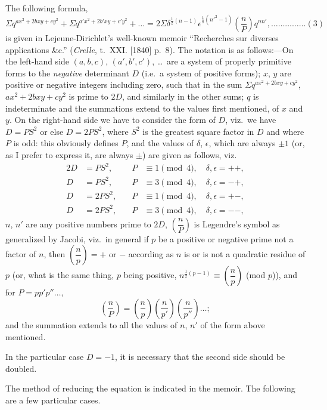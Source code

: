 \documentclass[11pt]{article}
\begin{document}
The following formula,
\[
\Sigma q^{ax^2 + 2bxy + cy^2} + \Sigma q^{a'x^2 + 2b'xy + c'y^2} + \ldots
= 2\Sigma \delta^{\frac{1}{2}(n-1)} \epsilon^{\frac{1}{8}(n'^2-1)} \left(\frac{n}{P}\right) q^{nn'},\ldots\ldots\ldots\ldots\ldots(3)
\]
is given in Lejeune-Dirichlet's well-known memoir ``Recherches sur diverses applications \&c.'' (\textit{Crelle}, t.~XXI. [1840] p.~8). The notation is as follows:---On the left-hand side $(a, b, c)$, $(a', b', c')$, \ldots\ are a system of properly primitive forms to the \textit{negative} determinant $D$ (i.e.\ a system of positive forms); $x$, $y$ are positive or negative integers including zero, such that in the sum $\Sigma q^{ax^2 + 2bxy + cy^2}$, $ax^2 + 2bxy + cy^2$ is prime to $2D$, and similarly in the other sums; $q$ is indeterminate and the summations extend to the values first mentioned, of $x$ and $y$. On the right-hand side we have to consider the form of $D$, viz.\ we have $D = PS^2$ or else $D = 2PS^2$, where $S^2$ is the greatest square factor in $D$ and where $P$ is odd: this obviously defines $P$, and the values of $\delta$, $\epsilon$, which are always $\pm 1$ (or, as I prefer to express it, are always $\pm$) are given as follows, viz.
\begin{alignat*}{2}
D &= PS^2, &\quad P &\equiv 1 \pmod{4}, \quad \delta, \epsilon = ++,\\
D &= PS^2, &\quad P &\equiv 3 \pmod{4}, \quad \delta, \epsilon = -+,\\
D &= 2PS^2, &\quad P &\equiv 1 \pmod{4}, \quad \delta, \epsilon = +-,\\
D &= 2PS^2, &\quad P &\equiv 3 \pmod{4}, \quad \delta, \epsilon = --,
\end{alignat*}
$n$, $n'$ are any positive numbers prime to $2D$, $\left(\dfrac{n}{P}\right)$ is Legendre's symbol as generalized by Jacobi, viz.\ in general if $p$ be a positive or negative prime not a factor of $n$, then $\left(\dfrac{n}{p}\right) = +$ or $-$ according as $n$ is or is not a quadratic residue of $p$ (or, what is the same thing, $p$ being positive, $n^{\frac{1}{2}(p-1)} \equiv \left(\dfrac{n}{p}\right)$ (mod $p$)), and for $P = pp'p''\ldots$,
\[
\left(\frac{n}{P}\right) = \left(\frac{n}{p}\right)\left(\frac{n}{p'}\right)\left(\frac{n}{p''}\right)\ldots;
\]
and the summation extends to all the values of $n$, $n'$ of the form above mentioned.

In the particular case $D = -1$, it is necessary that the second side should be doubled.

The method of reducing the equation is indicated in the memoir. The following are a few particular cases.
\end{document}
